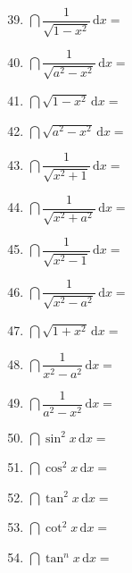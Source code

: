 \documentclass[./book.tex]{subfiles}
\begin{document}
    \begin{minipage}[t]{0.30\textwidth}
        \begin{enumerate}[leftmargin=*, itemsep=1.1em]
            \setcounter{enumi}{38}
            \item $\dint \dfrac{1}{\sqrt {1 - x^2}}\,\mathrm{d}x =$
            \item $\dint \dfrac{1}{\sqrt {a^2 - x^2}}\,\mathrm{d}x =$
            \item $\dint \sqrt {1 - x^2}\,\mathrm{d}x =$
            \item $\dint \sqrt {a^2 - x^2}\,\mathrm{d}x =$
            \item $\dint \dfrac{1}{\sqrt {x^2 + 1}}\,\mathrm{d}x =$
            \item $\dint \dfrac{1}{\sqrt {x^2 + a^2}}\,\mathrm{d}x =$
            \item $\dint \dfrac{1}{\sqrt {x^2 - 1}}\,\mathrm{d}x =$
            \item $\dint \dfrac{1}{\sqrt {x^2 - a^2}}\,\mathrm{d}x =$
            \item $\dint \sqrt{1+x^2}\,\mathrm{d}x =$
            \item $\dint \dfrac{1}{x^2 - a^2}\,\mathrm{d}x =$
            \item $\dint \dfrac{1}{a^2 - x^2}\,\mathrm{d}x =$
            \item $\dint \sin^2 x\,\mathrm{d}x =$
            \item $\dint \cos^2 x\,\mathrm{d}x =$
            \item $\dint \tan^2 x\,\mathrm{d}x =$
            \item $\dint \cot^2 x\,\mathrm{d}x =$
            \item $\dint \tan^n x\,\mathrm{d}x =$
        \end{enumerate}
    \end{minipage}
\end{document}
